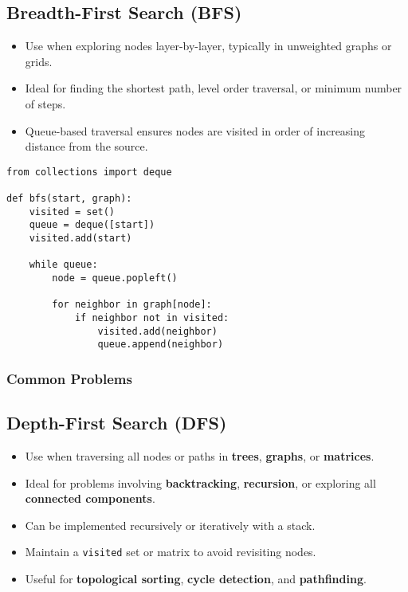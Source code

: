 \newpage


\subsection{Breadth-First Search (BFS)}
\begin{summary}
    \begin{itemize}
        \item Use when exploring nodes layer-by-layer, typically in unweighted graphs or grids.
        \item Ideal for finding the shortest path, level order traversal, or minimum number of steps.
        \item Queue-based traversal ensures nodes are visited in order of increasing distance from the source.
    \end{itemize}
\end{summary}

\begin{algo}
\begin{lstlisting}
from collections import deque

def bfs(start, graph):
    visited = set()
    queue = deque([start])
    visited.add(start)

    while queue:
        node = queue.popleft()

        for neighbor in graph[node]:
            if neighbor not in visited:
                visited.add(neighbor)
                queue.append(neighbor)
\end{lstlisting}
\end{algo}
\newpage

\subsubsection{Common Problems}
\begin{summary}
\end{summary}
\newpage

\subsection{Depth-First Search (DFS)}

\begin{summary}
    \begin{itemize}
        \item Use when traversing all nodes or paths in \textbf{trees}, \textbf{graphs}, or \textbf{matrices}.
        \item Ideal for problems involving \textbf{backtracking}, \textbf{recursion}, or exploring all \textbf{connected components}.
        \item Can be implemented recursively or iteratively with a stack.
        \item Maintain a \texttt{visited} set or matrix to avoid revisiting nodes.
        \item Useful for \textbf{topological sorting}, \textbf{cycle detection}, and \textbf{pathfinding}.
    \end{itemize}
\end{summary}


